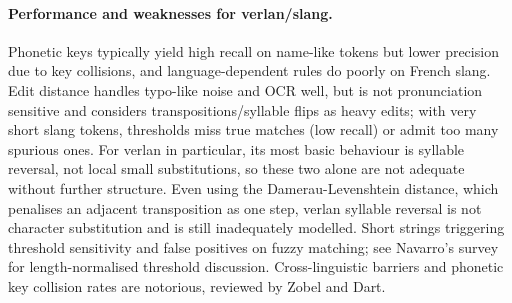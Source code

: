 \documentclass[12pt]{article}
\begin{document}
\paragraph{Performance and weaknesses for verlan/slang.} Phonetic keys typically yield high recall on name-like tokens but lower precision due to key collisions, and language-dependent rules do poorly on French slang. Edit distance handles typo-like noise and OCR well, but is not pronunciation sensitive and considers transpositions/syllable flips as heavy edits; with very short slang tokens, thresholds miss true matches (low recall) or admit too many spurious ones. For verlan in particular, its most basic behaviour is syllable reversal, not local small substitutions, so these two alone are not adequate without further structure. Even using the Damerau-Levenshtein distance, which penalises an adjacent transposition as one step, verlan syllable reversal is not character substitution and is still inadequately modelled. Short strings triggering threshold sensitivity and false positives on fuzzy matching; see Navarro's survey for length-normalised threshold discussion. Cross-linguistic barriers and phonetic key collision rates are notorious, reviewed by Zobel and Dart. \cite{damerau1964,navarro2001approximate,zobel1996phonetic}

\begin{table}[H]
\centering
{}
\caption{Classical fuzzy-match methods: strengths and limitations for slang/verlan.}
\label{tab:fuzzy_perf}
\end{table}
\end{document}
